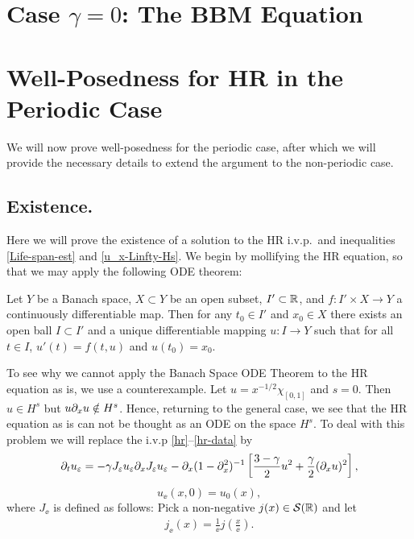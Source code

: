 \section{Case $\gamma = 0$: The BBM Equation} 
\label{sec:}

\section{Well-Posedness for HR in the Periodic Case}
%
%
%
%
We will now prove well-posedness for the periodic case, after which we will
provide the necessary details to extend the argument to the non-periodic case.
\subsection{Existence.}
\label{existence}
Here we will prove the existence of a solution to the HR i.v.p.\
and inequalities
\eqref{Life-span-est} and \eqref{u_x-Linfty-Hs}.  We begin by mollifying the HR equation, so that we may apply the following ODE
theorem: 
%
\begin{theorem}
\label{ode_theorem}
Let  $Y$  be a Banach space, $X\subset Y$ be an open subset,
$I' \subset \mathbb{R}$, and $f: I' \times X\to Y$ a continuously differentiable
map.  Then for any $t_{0} \in I'$ and $x_{0} \in X$ there exists an
open ball $I \subset I'$ and a unique differentiable mapping $u:I
\to Y$ such that for all $t \in I$,  $u'(t) = f(t, u)$
and $u(t_{0}) = x_{0}$.
\end{theorem}
%
To see why we cannot apply the Banach Space ODE Theorem to the HR equation as is,
we use a counterexample. Let $u=x^{-1/2} \chi_{[0,1]}$ and $s=0$. Then $u \in H^s$ but
$u\partial_x u \notin H^s$. Hence, returning to the general case, we see that the
HR equation as is can not be thought as an ODE on the space $H^s$.  To
deal with this problem we will replace the i.v.p \eqref{hr}--\eqref{hr-data} by  
\begin{equation}
\label{hr-moli}
\partial_t  u_\varepsilon =
-\gamma J_\varepsilon u_\varepsilon \partial_x  J_\varepsilon  u_\varepsilon - \partial_x (1-\partial_x^2)^{-1} 
\left [\frac{3-\gamma}{2}u^2 + \frac{\gamma}{2}(\partial_x u)^2 \right ],
\end{equation} 
%
\begin{equation} 
\label{hr-moli-data} 
u_\ee(x, 0) = u_0 (x),
\end{equation}
%
where $J_\ee$ is defined as follows: Pick a non-negative $j(x) \in
\mathcal{S}(\mathbb{R})$ and let
\begin{equation*}
\begin{split}
j_\ee(x) = \frac{1}{\ee}j\left( \frac{x}{\ee} \right).
\end{split}
\end{equation*}
